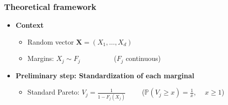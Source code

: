 \documentclass[9pt]{beamer}
\def\mb{\mathbf}
\begin{document}
\begin{frame}
\frametitle{Theoretical framework}
\begin{itemize}
\item \textbf{Context} 

  \begin{itemize}
  \item Random vector    $  \mb X = (X_{1},\ldots,X_{d})  $
    \vspace{0.3cm}
  \item Margins: $X_{j}\sim F_j$ ~~~~~~~~~($F_j$ continuous)\\
    \vspace{0.3cm}
  \end{itemize}
    \vspace{0.3cm}

\item \textbf{Preliminary step: Standardization of each marginal}\\
    \vspace{0.3cm}
    \begin{itemize}
    \item   Standard Pareto: 
    $V_{j} = \frac{1}{1- F_j (X_{j})} $  ~~~~\Big($\mathbb{P}(V_j \ge x) = \frac{1}{x}$,~~ $x\ge 1$\Big) \\
    \end{itemize}



\end{itemize}

\end{frame}
\end{document}
